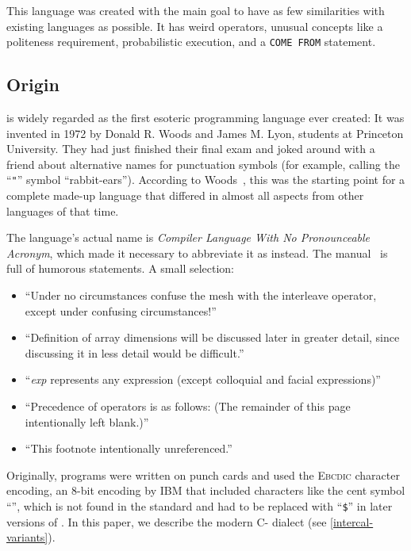 This language was created with the main goal to have as few similarities with existing languages as possible. It has weird operators, unusual concepts like a politeness requirement, probabilistic execution, and a \texttt{COME FROM} statement.

\subsection{Origin}

\ic{} is widely regarded as the first esoteric programming language ever created: It was invented in 1972 by Donald R. Woods and James M. Lyon, students at Princeton University. They had just finished their final exam and joked around with a friend about alternative names for punctuation symbols (for example, calling the “\texttt{"}” symbol “rabbit-ears”). According to Woods~\cite{hamilton2008az}, this was the starting point for a complete made-up language that differed in almost all aspects from other languages of that time.

The language's actual name is \emph{Compiler Language With No Pronounceable Acronym}, which made it necessary to abbreviate it as \emph{\ic{}} instead. The manual~\cite{woods1973intercal} is full of humorous statements. A small selection:

\begin{itemize}
    \item “Under no circumstances confuse the mesh with the interleave operator, except under confusing circumstances!”
    \item “Definition of array dimensions will be discussed later in greater detail, since discussing it in less detail would be difficult.”
    \item “\emph{exp} represents any expression (except colloquial and facial expressions)”
    \item “Precedence of operators is as follows: (The remainder of this page intentionally left blank.)”
    \item “This footnote intentionally unreferenced.”
\end{itemize}

Originally, \ic{} programs were written on punch cards and used the \textsc{Ebcdic} character encoding, an 8-bit encoding by IBM that included characters like the cent symbol “\texttt{\textcent}”, which is not found in the \ascii{} standard and had to be replaced with “\texttt{\$}” in later versions of \ic{}. In this paper, we describe the modern C-\ic{} dialect (see \cref{intercal-variants}).

